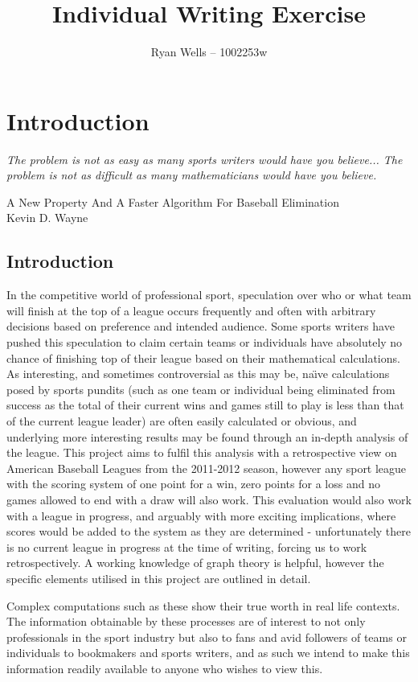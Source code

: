 \documentclass{report}
\title{Individual Writing Exercise}
\author{Ryan Wells -- 1002253w}
\begin{document}
\maketitle
\section*{Introduction}

\emph{The problem is not as easy as many sports writers would have you believe... The problem is not as difficult as many mathematicians would have you believe.}

A New Property And A Faster Algorithm For Baseball Elimination\\
Kevin D. Wayne\\
\subsection*{Introduction}
In the competitive world of professional sport, speculation over who or what team will finish at the top of a league occurs frequently and often with arbitrary decisions based on preference and intended audience. Some sports writers have pushed this speculation to claim certain teams or individuals have absolutely no chance of finishing top of their league based on their mathematical calculations. As interesting, and sometimes controversial as this may be, na\"{\i}ve calculations posed by sports pundits (such as one team or individual being eliminated from success as the total of their current wins and games still to play is less than that of the current league leader) are often easily calculated or obvious, and underlying more interesting results may be found through an in-depth analysis of the league. This project aims to fulfil this analysis with a retrospective view on American Baseball Leagues from the 2011-2012 season, however any sport league with the scoring system of one point for a win, zero points for a loss and no games allowed to end with a draw will also work. This evaluation would also work with a league in progress, and arguably with more exciting implications, where scores would be added to the system as they are determined - unfortunately there is no current league in progress at the time of writing, forcing us to work retrospectively. A working knowledge of graph theory is helpful, however the specific elements utilised in this project are outlined in detail. 

Complex computations such as these show their true worth in real life contexts. The information obtainable by these processes are of interest to not only professionals in the sport industry but also to fans and avid followers of teams or individuals to bookmakers and sports writers, and as such we intend to make this information readily available to anyone who wishes to view this. 
\end{document}
